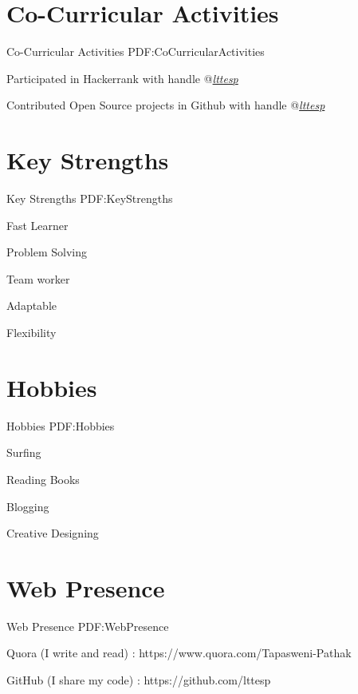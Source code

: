 \documentclass[letterpaper,MMMyyyy,nonstop]{simpleresumecv}
\begin{document}
\begin{body}
\section
{Co-Curricular Activities}
{Co-Curricular Activities}
{PDF:CoCurricularActivities}


\GapNoBreak
\BulletItem
Participated in Hackerrank with handle @\href{http://hackerrank.com/lttesp} \emph{lttesp}

\GapNoBreak
\BulletItem
Contributed Open Source projects in Github with handle @\href{http://hackerrank.com/lttesp} \emph{lttesp}


\section
{Key Strengths}
{Key Strengths}
{PDF:KeyStrengths}

\BulletItem
Fast Learner

\GapNoBreak
\BulletItem
Problem Solving

\GapNoBreak
\BulletItem
Team worker

\GapNoBreak
\BulletItem
Adaptable

\GapNoBreak
\BulletItem
Flexibility


\section
{Hobbies}
{Hobbies}
{PDF:Hobbies}

\BulletItem
Surfing

\GapNoBreak
\BulletItem
Reading Books

\GapNoBreak
\BulletItem
Blogging

\GapNoBreak
\BulletItem
Creative Designing 


\section
{Web Presence}
{Web Presence}
{PDF:WebPresence}

\BulletItem
Quora (I write and read) : https://www.quora.com/Tapasweni-Pathak

\GapNoBreak
\BulletItem
GitHub (I share my code) : https://github.com/lttesp


\end{body}
\end{document}

